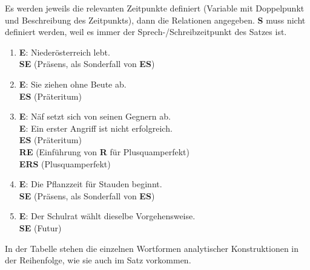 
\label{sol:verbalflexion01}

Es werden jeweils die relevanten Zeitpunkte definiert (Variable mit Doppelpunkt und Beschreibung des Zeitpunkts), dann die Relationen angegeben.
\textbf{S} muss nicht definiert werden, weil es immer der Sprech-/Schreibzeitpunkt des Satzes ist.

\begin{enumerate}
  \item \textbf{E}: Niederösterreich lebt.\\
    \textbf{S\REq E} (Präsens, als Sonderfall von \textbf{E\RUn S})
  \item \textbf{E}: Sie ziehen ohne Beute ab.\\
    \textbf{E\RPr S} (Präteritum)
  \item \textbf{E}: Näf setzt sich von seinen Gegnern ab.\\
    \textbf{E}: Ein erster Angriff ist nicht erfolgreich.\\
    \textbf{E\RPr S} (Präteritum)\\
    \textbf{R\REq E} (Einführung von \textbf{R} für Plusquamperfekt)\\
    \textbf{E\RPr R\RPr S} (Plusquamperfekt)
  \item \textbf{E}: Die Pflanzzeit für Stauden beginnt.\\
    \textbf{S\RPr E} (Präsens, als Sonderfall von \textbf{E\RUn S})
  \item \textbf{E}: Der Schulrat wählt dieselbe Vorgehensweise.\\
    \textbf{S\RPr E} (Futur)
\end{enumerate}

\label{sol:verbalflexion02}

In der Tabelle stehen die einzelnen Wortformen analytischer Konstruktionen in der Reihenfolge, wie sie auch im Satz vorkommen.

